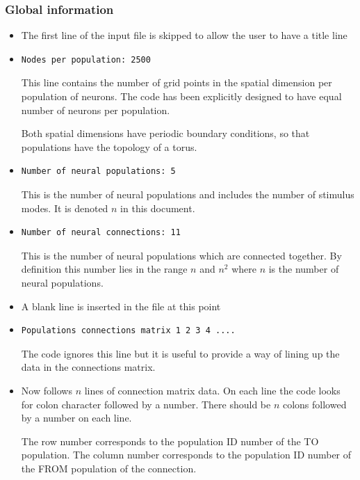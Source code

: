 \documentclass[12pt,a4paper]{article}
\begin{document}
\subsubsection{Global information}
\label{sec:global}
\begin{itemize}

\item The first line of the input file is skipped to allow the user to have a title
line
\item
\begin{lstlisting}
Nodes per population: 2500
\end{lstlisting}
This line contains the number of grid points in the spatial dimension per population of neurons. The code has been explicitly designed to have equal number of neurons per population.

Both spatial dimensions have periodic boundary conditions, so that populations have the topology of a torus.
\item
\begin{lstlisting}
Number of neural populations: 5
\end{lstlisting} This is the number of neural
populations and includes the number of stimulus modes. It is denoted
$n$ in this document.
\item
\begin{lstlisting}
Number of neural connections: 11
\end{lstlisting} This is the number of neural
populations which are connected together. By definition this number lies in the
range $n$ and $n^2$ where $n$ is the number of neural populations.
\item A blank line is inserted in the file at this point
\item
\begin{lstlisting}
Populations connections matrix 1 2 3 4 ....
\end{lstlisting} The code ignores this
line but it is useful to provide a way of lining up the data in the
connections matrix.
\item Now follows $n$ lines of connection matrix data. On each line the code looks for colon character followed by a number. There should be $n$ colons followed by a number on each line.
	
The row number corresponds to the population ID number of the TO population. The column number corresponds to the population ID number of the FROM population of the connection.


\end{itemize}
\end{document}
